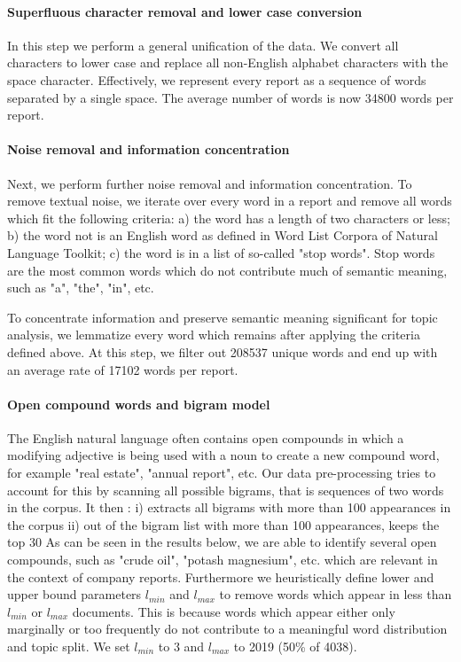 \documentclass[12pt,journal,letterpaper,oneside,onecolumn]{IEEEtran}
\begin{document}
\paragraph{Superfluous character removal and lower case conversion}
In this step we perform a general unification of the data. We convert all characters to lower case and replace all non-English alphabet characters with the space character. Effectively, we represent every report as a sequence of words separated by a single space. The average number of words is now 34800 words per report.

\paragraph{Noise removal and information concentration}
Next, we perform further noise removal and information concentration. To remove textual noise, we iterate over every word in a report and remove all words which fit the following criteria: a) the word has a length of two characters or less; b) the word not is an English word as defined in Word List Corpora of Natural Language Toolkit\cite{nltk_book_2009}; c) the word is in a list of so-called "stop words".
Stop words are the most common words which do not contribute much of semantic meaning, such as "a", "the", "in", etc. 

To concentrate information and preserve semantic meaning significant for topic analysis, we lemmatize every word which remains after applying the criteria defined above. At this step, we filter out 208537 unique words and end up with an average rate of 17102 words per report.

\paragraph{Open compound words and bigram model}
The English natural language often contains open compounds in which a modifying adjective is being used with a noun to create a new compound word, for example "real estate", "annual report", etc.
Our data pre-processing tries to account for this by scanning all possible bigrams, that is sequences of two words in the corpus.
It then : \newline
i) extracts all bigrams with  more than 100 appearances in the corpus \newline
ii) out of the bigram list with more than 100 appearances, keeps the top 30
As can be seen in the results below, we are able to identify several open compounds, such as "crude oil", "potash magnesium", etc. which are relevant in the context of company reports.
\newline
Furthermore we heuristically define lower and upper bound parameters $l_{min}$ and $l_{max}$ to remove words which appear in less than $l_{min}$ or $l_{max}$ documents. This is because words which appear either only marginally or too frequently do not contribute to a meaningful word distribution and topic split.
We set $l_{min}$ to 3 and $l_{max}$ to 2019 (50\% of 4038).
\end{document}
